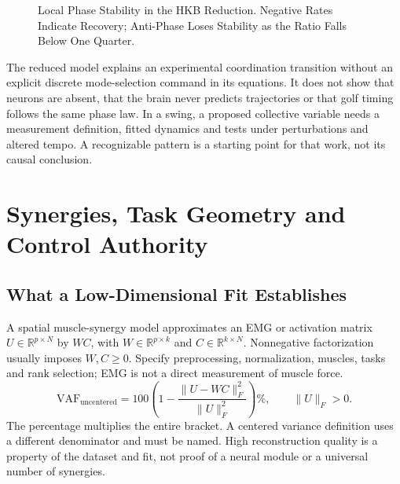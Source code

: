 \begin{figure}[htbp]
\centering
{}
\caption{Local Phase Stability in the HKB Reduction. Negative Rates Indicate
Recovery; Anti-Phase Loses Stability as the Ratio Falls Below One Quarter.}
\label{fig:ch8:hkb-bifurcation}
\end{figure}

The reduced model explains an experimental coordination transition without an
explicit discrete mode-selection command in its equations. It does not show
that neurons are absent, that the brain never predicts trajectories or that
golf timing follows the same phase law. In a swing, a proposed collective
variable needs a measurement definition, fitted dynamics and tests under
perturbations and altered tempo. A recognizable pattern is a starting point
for that work, not its causal conclusion.

\section{Synergies, Task Geometry and Control Authority}

\subsection{What a Low-Dimensional Fit Establishes}

A spatial muscle-synergy model approximates an EMG or activation matrix
$U\in\mathbb R^{p\times N}$ by $WC$, with $W\in\mathbb R^{p\times k}$ and
$C\in\mathbb R^{k\times N}$. Nonnegative factorization usually imposes
$W,C\geq0$. Specify preprocessing, normalization, muscles, tasks and rank
selection; EMG is not a direct measurement of muscle force.
\begin{equation}
\mathrm{VAF}_{\mathrm{uncentered}}
=100\left(1-\frac{\|U-WC\|_F^2}{\|U\|_F^2}\right)\%,
\qquad \|U\|_F>0.
\label{eq:ch8:vaf}
\end{equation}
The percentage multiplies the entire bracket. A centered variance definition
uses a different denominator and must be named. High reconstruction quality
is a property of the dataset and fit, not proof of a neural module or a
universal number of synergies.

